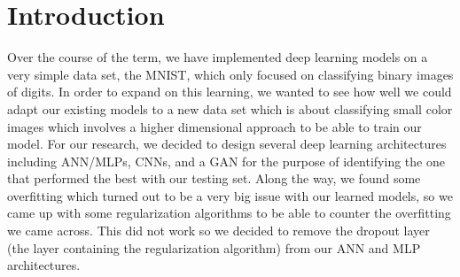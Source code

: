 \section{Introduction}
\label{sec:introduction}
Over the course of the term, we have implemented deep learning models on a very simple data set, the MNIST, which only focused on classifying binary images of digits. In order to expand on this learning, we wanted to see how well we could adapt our existing models to a new data set which is about classifying small color images which involves a higher dimensional approach to be able to train our model. For our research, we decided to design several deep learning architectures including ANN/MLPs, CNNs, and a GAN for the purpose of identifying the one that performed the best with our testing set. Along the way, we found some overfitting which turned out to be a very big issue with our learned models, so we came up with some regularization algorithms to be able to counter the overfitting we came across. This did not work so we decided to remove the dropout layer (the layer containing the regularization algorithm) from our ANN and MLP architectures. 